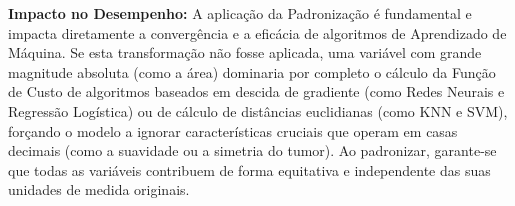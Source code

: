 \documentclass[12pt,a4paper]{article}
\begin{document}
\textbf{Impacto no Desempenho:} A aplicação da Padronização é fundamental e impacta diretamente a convergência e a eficácia de algoritmos de Aprendizado de Máquina. Se esta transformação não fosse aplicada, uma variável com grande magnitude absoluta (como a área) dominaria por completo o cálculo da Função de Custo de algoritmos baseados em descida de gradiente (como Redes Neurais e Regressão Logística) ou de cálculo de distâncias euclidianas (como KNN e SVM), forçando o modelo a ignorar características cruciais que operam em casas decimais (como a suavidade ou a simetria do tumor). Ao padronizar, garante-se que todas as variáveis contribuem de forma equitativa e independente das suas unidades de medida originais.
\end{document}
